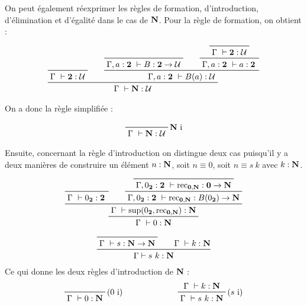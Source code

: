 \documentclass[../../rapport.tex]{subfiles}
\begin{document}
  On peut également réexprimer les règles de formation, d'introduction, d'élimination et d'égalité dans le cas de $\mathbf N$.
  Pour la règle de formation, on obtient :

  $$
  \prfinterspace=2em
  \prftree
    {\prfaxiom{\Gamma\ \vdash \2 : \U}}
    {\prftree
      {\prfaxiom{\Gamma, a : \2\ \vdash B : \2 \fun \U}}
      {\prftree
	{\prfaxiom{\Gamma\ \vdash \2 : \U}}
      {\Gamma, a : \2\ \vdash a : \2}}
    {\Gamma, a : \2\ \vdash B(a) : \U}}
  {\Gamma\ \vdash \N : \U}
  $$

  On a donc la règle simplifiée :

  $$
  \prfbyaxiom{$\N$ i}
    {\Gamma\ \vdash \N : \U}
  $$

  Ensuite, concernant la règle d'introduction on distingue deux cas puisqu'il y a deux manières de construire
  un élément $n : \mathbf N$, soit $n \equiv 0$, soit $n \equiv s\ k$ avec $k : \mathbf N$.

  $$
  \prfinterspace=2em
  \prftree
    {\prftree
      {\prfaxiom{\Gamma\ \vdash 0_{\2} : \2}}
      {\prftree
	{\prfaxiom{\Gamma, 0_{\2} : \2\ \vdash \rec_{\0, \N} : \0 \fun \N}}
      {\Gamma, 0_{\2} : \2\ \vdash \rec_{\0, \N} : B(0_{\2}) \fun \N}}
    {\Gamma\ \vdash \sup(0_{\2}, \rec_{\0, \N}) : \N}}
  {\Gamma\ \vdash 0 : \N}
  $$

  $$
  \prfinterspace=2em
  \prftree
    {\prfaxiom{\Gamma\ \vdash s : \N \fun \N}}
    {\Gamma\ \vdash k : \N}
  {\Gamma \vdash s\ k : \N}
  $$
  Ce qui donne les deux règles d'introduction de $\mathbf N$ :
  $$\begin{array}{cc}
    \prfbyaxiom{($0$ i)}{\Gamma\ \vdash 0 : \N}\hspace{2cm} & \prftree[r]{($s$ i)}{\Gamma\ \vdash k : \N}{\Gamma\ \vdash s\ k : \N}
  \end{array}$$
\end{document}
